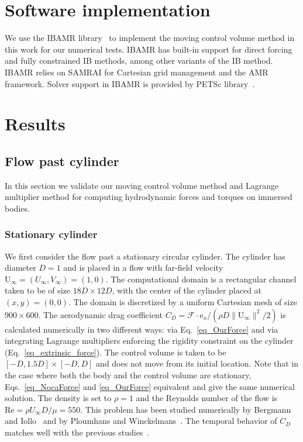 \documentclass[review]{elsarticle}
\renewcommand{\vec}[1]{\bm{\mathrm{#1}}}
\def \e{\vec{e}}
\def \U{\vec{U}}
\def \cF{\vec{\mathcal{F}}}
\def \U{\vec{U}}
\def \e{\vec{e}}
\def \Re{\text{Re}}
\begin{document}

\section{Software implementation} \label{sec_software_implementation}
We use the IBAMR library~\cite{IBAMR-web-page} to implement the moving control volume 
method in this work for our numerical tests. IBAMR has built-in support for direct 
forcing and fully constrained IB methods, among other variants of the IB method.
IBAMR relies on SAMRAI \cite{HornungKohn02, samrai-web-page} for Cartesian grid 
management and the AMR framework. Solver support in IBAMR is provided by 
PETSc library~\cite{petsc-efficient, petsc-user-ref, petsc-web-page}.



\section{Results}
\label{sec_results}

\subsection{Flow past cylinder}
In this section we validate our moving control volume method and Lagrange 
multiplier method for computing hydrodynamic forces and torques on immersed
bodies.
\subsubsection{Stationary cylinder}
\label{sec_stationary_cylinder}

We first consider the flow past a stationary circular cylinder. The cylinder 
has diameter $D = 1$ and is placed in a flow with far-field velocity 
$\U_{\infty} = (U_{\infty}, V_{\infty})=(1,0)$. The computational domain 
is a rectangular channel taken to be of size $18 D \times 12 D$, with 
the center of the cylinder placed at $(x,y) = (0,0)$. The domain is discretized 
by a uniform Cartesian mesh of size $900 \times 600$. The aerodynamic 
drag coefficient $C_D = \cF \cdot \e_x/(\rho D \|\U_{\infty}\|^2/2)$ is calculated numerically 
in two different ways: via Eq.~\eqref{eq_OurForce} and via integrating Lagrange 
multipliers enforcing the rigidity constraint on the cylinder (Eq.~\eqref{eq_extrinsic_force}). The control volume
is taken to be $[-D, 1.5 D] \times [-D, D]$ and does not move from its initial location.
Note that in the case where both the body and the control volume are stationary,
Eqs.~\eqref{eq_NocaForce} and \eqref{eq_OurForce} equivalent and give the same numerical 
solution. The density is set to $\rho = 1$ and the Reynolds number of the flow is $\Re = \rho U_{\infty} D / \mu = 550$. 
This problem has been studied numerically by Bergmann and Iollo~\cite{Bergmann11} 
and by Ploumhans and Winckelmans~\cite{Ploumhans2000}. The temporal behavior 
of $C_D$ matches well with the previous studies~\cite{Bergmann11,Ploumhans2000}.
\end{document}
